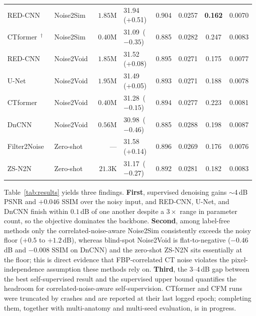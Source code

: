 \documentclass[10pt,twocolumn]{article}
\begin{document}
\begin{table}[t]
\begin{tabular}{llrlcccc}
    RED-CNN~\cite{chen2017lowdose}   & Noise2Sim~\cite{niu2020noise2sim} & $1.85\mathrm{M}$ & 31.94 \,(+0.51) & 0.904 & 0.0257 & \textbf{0.162} & 0.0070 \\
    CTformer~\cite{wang2022ctformer}$^{\dagger}$ & Noise2Sim~\cite{niu2020noise2sim} & $0.40\mathrm{M}$ & 31.09 \,($-0.35$) & 0.885 & 0.0282 & 0.247 & 0.0083 \\
    \midrule
    RED-CNN~\cite{chen2017lowdose}   & Noise2Void~\cite{krull2019noise2void} & $1.85\mathrm{M}$ & 31.52 \,(+0.08) & 0.895 & 0.0271 & 0.175 & 0.0077 \\
    U-Net                            & Noise2Void~\cite{krull2019noise2void} & $1.95\mathrm{M}$ & 31.49 \,(+0.05) & 0.893 & 0.0271 & 0.188 & 0.0078 \\
    CTformer~\cite{wang2022ctformer} & Noise2Void~\cite{krull2019noise2void} & $0.40\mathrm{M}$ & 31.28 \,($-0.15$) & 0.894 & 0.0277 & 0.223 & 0.0081 \\
    DnCNN~\cite{zhang2017beyond}     & Noise2Void~\cite{krull2019noise2void} & $0.56\mathrm{M}$ & 30.98 \,($-0.46$) & 0.885 & 0.0288 & 0.198 & 0.0087 \\
    \midrule
    Filter2Noise~\cite{sun2025filter2noise} & Zero-shot & --- & 31.58 \,(+0.14) & 0.896 & 0.0269 & 0.176 & 0.0076 \\
    ZS-N2N~\cite{mansour2023zsn2n}          & Zero-shot & $21.3\mathrm{K}$ & 31.17 \,($-0.27$) & 0.892 & 0.0281 & 0.182 & 0.0083 \\
    \bottomrule
  \end{tabular}
\end{table}

Table~\ref{tab:results} yields three findings.  \textbf{First}, supervised
denoising gains $\sim$4\,dB PSNR and $+0.046$ SSIM over the noisy input, and
RED-CNN, U-Net, and DnCNN finish within $0.1$\,dB of one another despite a
$3\times$ range in parameter count, so the objective dominates the backbone.
\textbf{Second}, among label-free methods only the correlated-noise-aware
Noise2Sim consistently exceeds the noisy floor ($+0.5$ to $+1.2$\,dB),
whereas blind-spot Noise2Void is flat-to-negative ($-0.46$\,dB and $-0.008$
SSIM on DnCNN) and the zero-shot ZS-N2N sits essentially at the floor; this
is direct evidence that FBP-correlated CT noise violates the
pixel-independence assumption these methods rely on.  \textbf{Third}, the
$3$--$4$\,dB gap between the best self-supervised result and the supervised
upper bound quantifies the headroom for correlated-noise-aware
self-supervision.  CTformer and CFM runs were truncated by crashes and are
reported at their last logged epoch; completing them, together with
multi-anatomy and multi-seed evaluation, is in progress.
\end{document}
